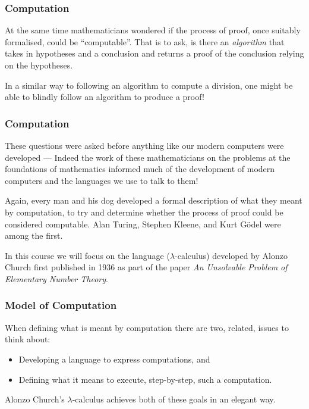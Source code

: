 \documentclass{beamer}
\begin{document}
\begin{frame}
	\frametitle{Computation}

	At the same time mathematicians wondered if the process of proof, once suitably formalised, could be ``computable''. That is to ask, is there an \emph{algorithm} that takes in hypotheses and a conclusion and returns a proof of the conclusion relying on the hypotheses. 
	
	\vspace{5mm}
	
	In a similar way to following an algorithm to compute a division, one might be able to blindly follow an algorithm to produce a proof!
\end{frame}

\begin{frame}
	\frametitle{Computation}

	These questions were asked before anything like our modern computers were developed --- Indeed the work of these mathematicians on the problems at the foundations of mathematics informed much of the development of modern computers and the languages we use to talk to them!

	\vspace{5mm}

	Again, every man and his dog developed a formal description of what they meant by computation, to try and determine whether the process of proof could be considered computable. Alan Turing, Stephen Kleene, and Kurt G\"{o}del were among the first. 

	\vspace{5mm}

	In this course we will focus on the language ($\lambda$-calculus) developed by Alonzo Church first published in 1936 as part of the paper \emph{An Unsolvable Problem of Elementary Number Theory}.
\end{frame}

\begin{frame}
	\frametitle{Model of Computation}

	When defining what is meant by computation there are two, related, issues to think about: 

	\begin{itemize}
		\item[] Developing a language to express computations, and
		\item[] Defining what it means to execute, step-by-step, such a computation.
	\end{itemize}

	Alonzo Church's $\lambda$-calculus achieves both of these goals in an elegant way.
\end{frame}
\end{document}

